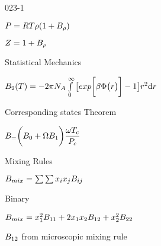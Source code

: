 \begin{mitframe}{023-1}

    
\begin{listone}
        
    \item $\p=\gasconst\Temp\dens(1+\virialcoeff\dens)$
    
    \item$\compress= 1+\virialcoeff\dens$
    
    \item Statistical Mechanics
    
    \begin{listtwo}
		
        \item $\virialcoeff{2}(\Temp)=-2\pi\av\int\limits_{0}^{\infty}\big[exp\bigg[\boltznorm\pot\big(\pos\big)\bigg]-1\big]\pos^2\mathrm{d}\pos$
     
    \end{listtwo}
    
    \item Corresponding states Theorem

    \begin{listtwo}
		
    \item $\virialcoeff=\bigg(\virialcoeff{\init}+\mpc\virialcoeff{1}\bigg)\dfrac{\accentfac\Temp_{c}}{\p_{c}}$
    
          	
    \end{listtwo}
    
    \item Mixing Rules
    
    \begin{listtwo}
		
    \item $\virialcoeff{\mixfunc} =\sum\sum\specfrac{i}\specfrac{j}\virialcoeff{ij}$
        
   	\item Binary
        
        \begin{listthree}
		
           \item$\virialcoeff{\mixfunc} =\disp_{1}^{2}\virialcoeff{11}+2\disp_{1}\disp_{2}\virialcoeff{12}+\disp_{2}^{2}\virialcoeff{22}$
			\item $\virialcoeff{12}$  from microscopic mixing rule
                

\end{listthree}
\end{listtwo}
\end{listone}
\end{mitframe}
